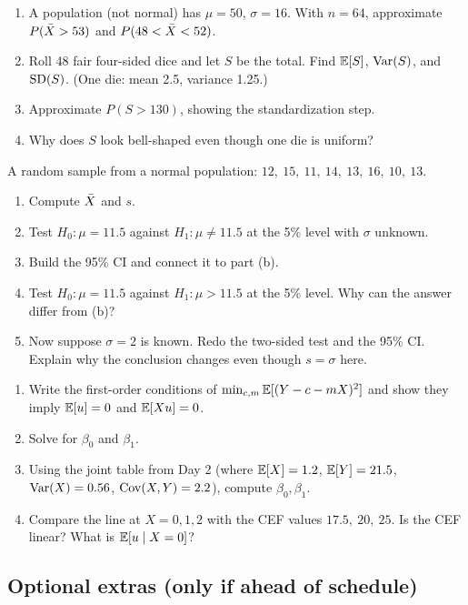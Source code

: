 \documentclass[11pt]{article}
\begin{document}
\begin{enumerate}[label=(\alph*)]
  \item A population (not normal) has $\mu=50$, $\sigma=16$. With $n=64$, approximate $P(\bar{X}>53)$ and $P(48<\bar{X}<52)$.
  \item Roll 48 fair four-sided dice and let $S$ be the total. Find $\mathbb{E}[S]$, $\operatorname{Var}(S)$, and $\operatorname{SD}(S)$. (One die: mean 2.5, variance 1.25.)
  \item Approximate $P(S>130)$, showing the standardization step.
  \item Why does $S$ look bell-shaped even though one die is uniform?
\end{enumerate}

A random sample from a normal population: $12,\ 15,\ 11,\ 14,\ 13,\ 16,\ 10,\ 13$.
\begin{enumerate}[label=(\alph*)]
  \item Compute $\bar{X}$ and $s$.
  \item Test $H_0:\mu=11.5$ against $H_1:\mu\ne11.5$ at the 5\% level with $\sigma$ unknown.
  \item Build the 95\% CI and connect it to part (b).
  \item Test $H_0:\mu=11.5$ against $H_1:\mu>11.5$ at the 5\% level. Why can the answer differ from (b)?
  \item Now suppose $\sigma=2$ is known. Redo the two-sided test and the 95\% CI. Explain why the conclusion changes even though $s=\sigma$ here.
\end{enumerate}

\begin{enumerate}[label=(\alph*)]
  \item Write the first-order conditions of $\min_{c,m}\mathbb{E}[(Y-c-mX)^2]$ and show they imply $\mathbb{E}[u]=0$ and $\mathbb{E}[Xu]=0$.
  \item Solve for $\beta_0$ and $\beta_1$.
  \item Using the joint table from Day 2 (where $\mathbb{E}[X]=1.2$, $\mathbb{E}[Y]=21.5$, $\operatorname{Var}(X)=0.56$, $\operatorname{Cov}(X,Y)=2.2$), compute $\beta_0,\beta_1$.
  \item Compare the line at $X=0,1,2$ with the CEF values $17.5,\ 20,\ 25$. Is the CEF linear? What is $\mathbb{E}[u\mid X=0]$?
\end{enumerate}

\subsection{Optional extras (only if ahead of schedule)}
\end{document}
